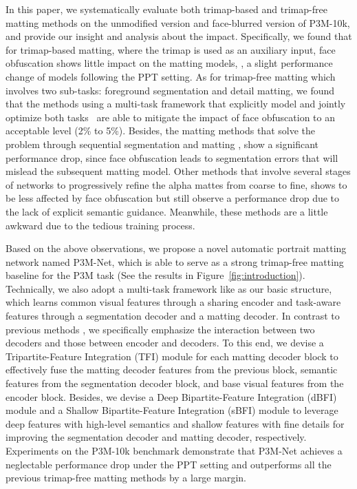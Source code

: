 \documentclass[sigconf]{acmart}
\begin{document}
In this paper, we systematically evaluate both trimap-based and trimap-free matting methods on the unmodified version and face-blurred version of P3M-10k, and provide our insight and analysis about the impact. Specifically, we found that for trimap-based matting, where the trimap is used as an auxiliary input, face obfuscation shows little impact on the matting models, , a slight performance change of models following the PPT setting. As for trimap-free matting which involves two sub-tasks: foreground segmentation and detail matting, we found that the methods using a multi-task framework that explicitly model and jointly optimize both tasks~\cite{gfm,hatt} are able to mitigate the impact of face obfuscation to an acceptable level (2\% to 5\%). Besides, the matting methods that solve the problem through sequential segmentation and matting \cite{shm,dapm}, show a significant performance drop, since face obfuscation leads to segmentation errors that will mislead the subsequent matting model. Other methods that involve several stages of networks to progressively refine the alpha mattes from coarse to fine, shows to be less affected by face obfuscation but still observe a performance drop due to the lack of explicit semantic guidance. Meanwhile, these methods are a little awkward due to the tedious training process.

Based on the above observations, we propose a novel automatic portrait matting network named P3M-Net, which is able to serve as a strong trimap-free matting baseline for the P3M task (See the results in Figure~\ref{fig:introduction}). Technically, we also adopt a multi-task framework like \cite{gfm,hatt} as our basic structure, which learns common visual features through a sharing encoder and task-aware features through a segmentation decoder and a matting decoder. In contrast to previous methods \cite{gfm,hatt}, we specifically emphasize the interaction between two decoders and those between encoder and decoders. To this end, we 
devise a Tripartite-Feature Integration (TFI) module for each matting decoder block to effectively fuse the matting decoder features from the previous block, semantic features from the segmentation decoder block, and base visual features from the encoder block. Besides, we devise a Deep Bipartite-Feature Integration (dBFI) module and a Shallow Bipartite-Feature Integration (sBFI) module to leverage deep features with high-level semantics and shallow features with fine details for improving the segmentation decoder and matting decoder, respectively. Experiments on the P3M-10k benchmark demonstrate that P3M-Net achieves a neglectable performance drop under the PPT setting and outperforms all the previous trimap-free matting methods by a large margin. 
\end{document}
